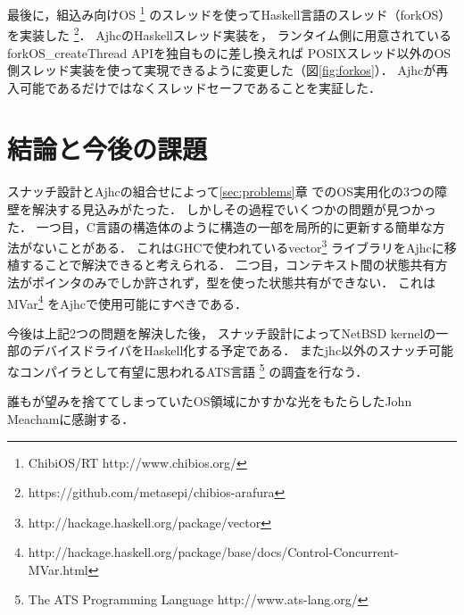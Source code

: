 \documentclass[submit,techreq,noauthor]{ipsj}
\begin{document}
最後に，組込み向けOS
\footnote{ChibiOS/RT http://www.chibios.org/}
のスレッドを使ってHaskell言語のスレッド（forkOS）を実装した
\footnote{https://github.com/metasepi/chibios-arafura}．
AjhcのHaskellスレッド実装を，
ランタイム側に用意されているforkOS\_createThread APIを独自ものに差し換えれば
POSIXスレッド以外のOS側スレッド実装を使って実現できるように変更した（図\ref{fig:forkos}）．
Ajhcが再入可能であるだけではなくスレッドセーフであることを実証した．

\section{結論と今後の課題}

スナッチ設計とAjhcの組合せによって\ref{sec:problems}章
でのOS実用化の3つの障壁を解決する見込みがたった．
しかしその過程でいくつかの問題が見つかった．
一つ目，C言語の構造体のように構造の一部を局所的に更新する簡単な方法がないことがある．
これはGHCで使われているvector\footnote{http://hackage.haskell.org/package/vector}
ライブラリをAjhcに移植することで解決できると考えられる．
二つ目，コンテキスト間の状態共有方法がポインタのみでしか許されず，型を使った状態共有ができない．
これはMVar\footnote{http://hackage.haskell.org/package/base/docs/Control-Concurrent-MVar.html}
をAjhcで使用可能にすべきである．

今後は上記2つの問題を解決した後，
スナッチ設計によってNetBSD kernelの一部のデバイスドライバをHaskell化する予定である．
またjhc以外のスナッチ可能なコンパイラとして有望に思われるATS言語
\footnote{The ATS Programming Language http://www.ats-lang.org/}
の調査を行なう．

\begin{acknowledgment}
誰もが望みを捨ててしまっていたOS領域にかすかな光をもたらしたJohn Meachamに感謝する．
\end{acknowledgment}



\end{document}
